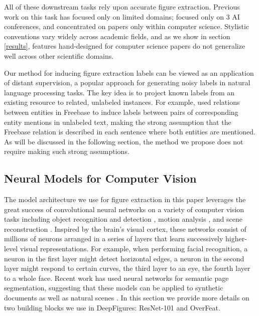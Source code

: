 \documentclass[sigconf]{acmart}
\begin{document}
All of these downstream tasks rely upon accurate figure extraction. Previous work on this task has focused only on limited domains; \cite{pdffigures} focused only on 3 AI conferences, and \cite{pdffigures2} concentrated on papers only within computer science. Stylistic conventions vary widely across academic fields, and as we show in section \ref{results}, features hand-designed for computer science papers do not generalize well across other scientific domains.

Our method for inducing figure extraction labels can be viewed as an application of distant supervision, a popular approach for generating noisy labels in natural language processing tasks.
The key idea is to project known labels from an existing resource to related, unlabeled instances.
For example, \cite{Mintz2009DistantSF} used relations between entities in Freebase \cite{Bollacker2008FreebaseAC} to induce labels between pairs of corresponding entity mentions in unlabeled text, making the strong assumption that the Freebase relation is described in each sentence where both entities are mentioned.
As will be discussed in the following section, the method we propose does not require making such strong assumptions.

\subsection{Neural Models for Computer Vision}

The model architecture we use for figure extraction in this paper leverages the great success of convolutional neural networks on a variety of computer vision tasks including object recognition and detection \cite{resnet}, motion analysis \cite{Dosovitskiy2015FlowNet}, and scene reconstruction \cite{Yang2016Realtime3S}.
Inspired by the brain's visual cortex, these networks consist of millions of neurons arranged in a series of layers that learn successively higher-level visual representations. 
For example, when performing facial recognition, a neuron in the first layer might detect horizontal edges, a neuron in the second layer might respond to certain curves, the third layer to an eye, the fourth layer to a whole face. Recent work has used neural networks for semantic page segmentation, suggesting that these models can be applied to synthetic documents as well as natural scenes \cite{Chen2015ICDAR,Yang2017CVPR,He2017ICDAR}.
In this section we provide more details on two building blocks we use in DeepFigures: ResNet-101 and OverFeat.
\end{document}
